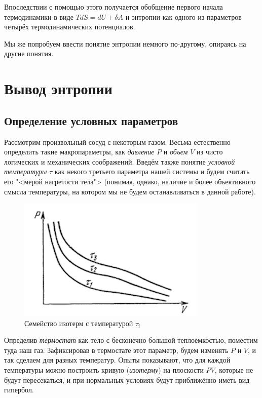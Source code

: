 \documentclass[12pt]{kiarticle}
\newcommand{\del}{\ensuremath{\delta}}
\begin{document}
Впоследствии с помощью этого получается обобщение первого начала термодинамики в виде $ TdS = dU + \del A $ и энтропии как одного из параметров четырёх термодинамических потенциалов. 

Мы же попробуем ввести понятие энтропии немного по-другому, опираясь на другие понятия.

\section{Вывод энтропии}

\subsection{Определение условных параметров} \label{ifTS}

Рассмотрим произвольный сосуд с некоторым газом. Весьма естественно определить такие макропараметры, как \textit{давление} $ P $ и \textit{объем} $ V $ из чисто логических и механических соображений. Введём также понятие \textit{условной температуры} $ \tau $ как некого третьего параметра нашей системы и будем считать его "<мерой нагретости тела"> (понимая, однако, наличие и более объективного смысла температуры, на котором мы не будем останавливаться в данной работе). 

 \begin{figure} 
	\includegraphics{tempdef}
	\caption{Семейство изотерм с температурой $ \tau_i $}
\end{figure}

Определив \textit{термостат} как тело с бесконечно большой теплоёмкостью, поместим туда наш газ. Зафиксировав в термостате этот параметр, будем изменять $ P $ и $ V $, и так сделаем для разных температур. Опыты показывают, что для каждой температуры можно построить кривую (\textit{изотерму}) на плоскости $ PV $, которые не будут пересекаться, и при нормальных условиях будут приближённо иметь вид гипербол. 
\end{document}
